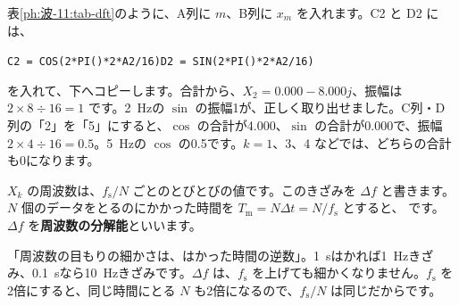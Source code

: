 表\ref{ph:波-11:tab-dft}のように、A列に $m$、B列に $x_m$ を入れます。C2 と D2 には、
\begin{bkcenter}
\texttt{C2 = COS(2*PI()*2*A2/16)}\qquad\texttt{D2 = SIN(2*PI()*2*A2/16)}
\end{bkcenter}
を入れて、下へコピーします。合計から、$X_2=0.000-8.000j$、振幅は $2\times8\div16=1$ です。\qty{2}{Hz}の $\sin$ の振幅1が、正しく取り出せました。C列・D列の「2」を「5」にすると、$\cos$ の合計が4.000、$\sin$ の合計が0.000で、振幅 $2\times4\div16=0.5$。\qty{5}{Hz}の $\cos$ の0.5です。$k=1$、3、4 などでは、どちらの合計も0になります。

\begin{bkcenter}
\label{ph:波-11:tab-dft}
\end{bkcenter}

$X_k$ の周波数は、$f_{\mathrm s}/N$ ごとのとびとびの値です。このきざみを $\Delta f$ と書きます。$N$ 個のデータをとるのにかかった時間を $T_{\mathrm m}=N\Delta t=N/f_{\mathrm s}$ とすると、
\label{ph:波-11:df}です。$\Delta f$ を\textbf{周波数の分解能}といいます。

\begin{phyomi}[$\Delta f=1/T_{\mathrm m}$]
「周波数の目もりの細かさは、はかった時間の逆数」。\qty{1}{s}はかれば\qty{1}{Hz}きざみ、\qty{0.1}{s}なら\qty{10}{Hz}きざみです。$\Delta f$ は、$f_{\mathrm s}$ を上げても細かくなりません。$f_{\mathrm s}$ を2倍にすると、同じ時間にとる $N$ も2倍になるので、$f_{\mathrm s}/N$ は同じだからです。
\end{phyomi}

